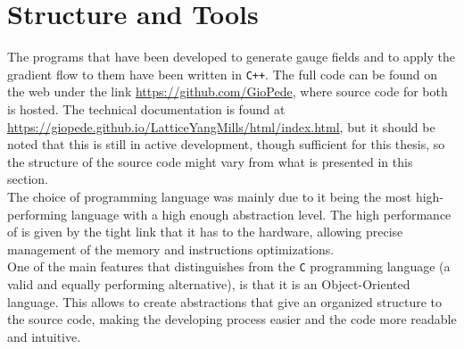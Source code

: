 \section{Structure and Tools}
The programs that have been developed to generate gauge fields and to apply the gradient flow to them have been written in \texttt{C++}. The full code can be found on the web under the link \url{https://github.com/GioPede}, where source code for both is hosted. The technical documentation is found at \url{https://giopede.github.io/LatticeYangMills/html/index.html}, but it should be noted that this is still in active development, though sufficient for this thesis, so the structure of the source code might vary from what is presented in this section. \\
The choice of programming language was mainly due to it being the most high-performing language with a high enough abstraction level. The high performance of \cpp is given by the tight link that it has to the hardware, allowing precise management of the memory and instructions optimizations. \\
One of the main features that distinguishes \cpp from the \texttt{C} programming language (a valid and equally performing alternative), is that it is an Object-Oriented language. This allows to create abstractions that give an organized structure to the source code, making the developing process easier and the code more readable and intuitive.

